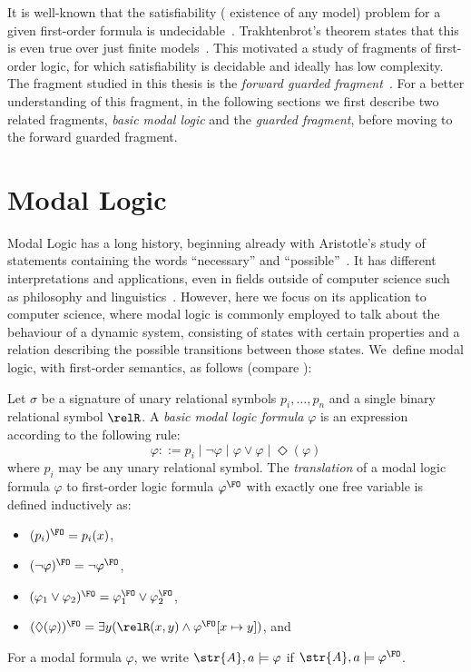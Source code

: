 It is well-known that the satisfiability (\ie{} existence of any model) problem for a given first-order formula is undecidable~\cite[Sec. 1.1]{borger1997}.
Trakhtenbrot's theorem states that this is even true over just finite models~\cite{trakhtenbrot50}.
This motivated a study of fragments of first-order logic, for which satisfiability is decidable and ideally has low complexity.
The fragment studied in this thesis is the \emph{forward guarded fragment}~\cite[Sec. 3.1]{Bednarczyk21}.
For a better understanding of this fragment, in the following sections we first describe two related fragments, \emph{basic modal logic} and the \emph{guarded fragment}, before moving to the forward guarded fragment.

\section{Modal Logic}
Modal Logic has a long history, beginning already with Aristotle's study of statements containing the words ``necessary'' and ``possible''~\cite{goldblatt2006}.
It has different interpretations and applications, even in fields outside of computer science such as philosophy and linguistics~\cite{vanBenthem2010-VANMLF-4}.
However, here we focus on its application to computer science, where modal logic is commonly employed to talk about the behaviour of a dynamic system, consisting of states with certain properties and a relation describing the possible transitions between those states.
We~define modal logic, with first-order semantics, as follows (compare \cite[Sec. 2.1.2]{otto2004a}):
\begin{definition}
  Let $\sigma$ be a signature of unary relational symbols $p_{i}, \ldots, p_{n}$ and a single binary relational symbol $\relR$.
  A \emph{basic modal logic formula} $\varphi$ is an expression according to the following rule:
  \begin{equation*}
    \varphi ::= p_{i}
      \mid \neg \varphi
      \mid \varphi \lor \varphi
      \mid \Diamond(\varphi)
  \end{equation*}
  where $p_{i}$ may be any unary relational symbol.
  The \emph{translation} of a modal logic formula $\varphi$ to first-order logic formula $\varphi^{\FO}$ with exactly one free variable is defined inductively as:
  \begin{itemize}
    \item $(p_{i})^{\FO} = p_{i}(x)$,
    \item $(\neg \varphi)^{\FO} = \neg \varphi^{\FO}$,
    \item $(\varphi_{1} \lor \varphi_{2})^{\FO} = \varphi_{1}^{\FO} \lor \varphi_{2}^{\FO}$,
    \item $(\Diamond (\varphi))^{\FO} = \exists{y}(\relR(x,y) \land \varphi^{\FO}[x \mapsto y])$, and
  \end{itemize}
  For a modal formula $\varphi$, we write $\str{A}, a \models \varphi$ if $\str{A}, a \models \varphi^{\FO}$.
\end{definition}
